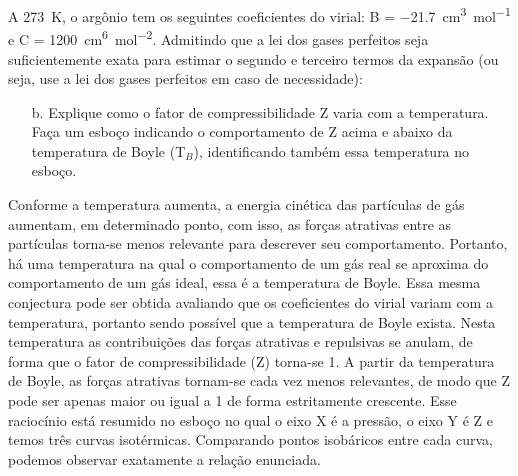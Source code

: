 \begin{xcs}
    A \qty{273}{K}, o argônio tem os seguintes coeficientes do virial: 
    B = \qty{-21,7}{cm^3 mol^{-1}} e C = \qty{1200}{cm^6 mol^{-2}}.
    Admitindo que a lei dos gases perfeitos seja
    suficientemente exata para estimar o segundo e terceiro termos da expansão
    (ou seja, use a lei dos gases perfeitos em caso de necessidade): 
    \begin{enumerate}[label=\alph*.]
        \item[b.] Explique como o fator de compressibilidade Z varia com a
            temperatura. Faça um esboço indicando o comportamento de Z acima e
            abaixo da temperatura de Boyle (T\(_B\)), identificando também essa
            temperatura no esboço. 
    \end{enumerate}
\end{xcs}
\begin{rsl}
    Conforme a temperatura aumenta, a  energia cinética das partículas de gás aumentam, em determinado ponto, com isso, as forças atrativas entre as partículas torna-se menos relevante para descrever seu comportamento. Portanto, há uma temperatura na qual o comportamento de um gás real se aproxima do comportamento de um gás ideal, essa é a temperatura de Boyle. Essa mesma conjectura pode ser obtida avaliando que os coeficientes do virial variam com a temperatura, portanto sendo possível que a temperatura de Boyle exista. Nesta temperatura as contribuições das forças atrativas e repulsivas se anulam, de forma que o fator de compressibilidade (Z) torna-se 1. A partir da temperatura de Boyle, as forças atrativas tornam-se cada vez menos relevantes, de modo que Z pode ser apenas maior ou igual a 1 de forma estritamente crescente. Esse raciocínio está resumido no esboço %
    no qual o eixo X é a pressão, o eixo Y é Z e temos três curvas isotérmicas. Comparando pontos isobáricos entre cada curva, podemos observar exatamente a relação enunciada. 
\end{rsl}
